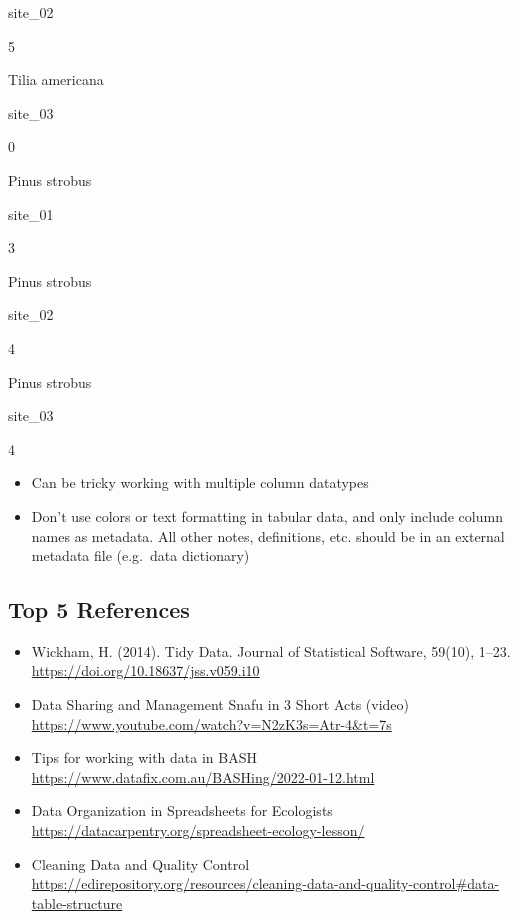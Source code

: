 \documentclass[
  oneside]{book}
\providecommand{\tightlist}{%
  \setlength{\itemsep}{0pt}\setlength{\parskip}{0pt}}
\begin{document}
site\_02

5

Tilia americana

site\_03

0

Pinus strobus

site\_01

3

Pinus strobus

site\_02

4

Pinus strobus

site\_03

4

\begin{itemize}
\tightlist
\item
  Can be tricky working with multiple column datatypes
\item
  Don't use colors or text formatting in tabular data, and only include column names as metadata. All other notes, definitions, etc. should be in an external metadata file (e.g.~data dictionary)
\end{itemize}

\hypertarget{top-5-references-1}{%
\subsection{Top 5 References}\label{top-5-references-1}}

\begin{itemize}
\tightlist
\item
  Wickham, H. (2014). Tidy Data. Journal of Statistical Software, 59(10), 1--23. \url{https://doi.org/10.18637/jss.v059.i10}
\item
  Data Sharing and Management Snafu in 3 Short Acts (video)\\
  \url{https://www.youtube.com/watch?v=N2zK3s=Atr-4\&t=7s}
\item
  Tips for working with data in BASH\\
  \url{https://www.datafix.com.au/BASHing/2022-01-12.html}
\item
  Data Organization in Spreadsheets for Ecologists\\
  \url{https://datacarpentry.org/spreadsheet-ecology-lesson/}
\item
  Cleaning Data and Quality Control\\
  \url{https://edirepository.org/resources/cleaning-data-and-quality-control\#data-table-structure}
\end{itemize}
\end{document}
